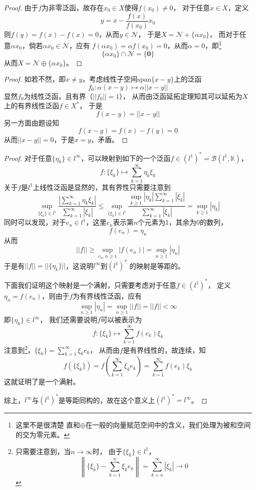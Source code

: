 \documentclass[cn]{homework}
\begin{document}
    \problem
    \begin{proof}
        由于$f$为非零泛函，故存在$x_0\in X$使得$f(x_0)\neq 0$，
        对于任意$x\in X$，定义
        \[y=x-\frac{f(x)}{f(x_0)}x_0\]
        则$f(y)=f(x)-f(x)=0$，从而$y\in\mathscr N$，
        于是$X=\mathscr N+\{\alpha x_0\}$，
        而对于任意$\alpha x_0$，倘若$\alpha x_0\in\mathscr N$，应有
        $f(\alpha x_0)=\alpha f(x_0)=0$，从而$\alpha=0$，即\footnote{这里不是很清楚
        直和$\oplus$在一般的向量赋范空间中的含义，我们处理为被和空间的交为零元素。}
        \[\{\alpha x_0\}\cap\mathscr N=\{\boldsymbol 0\}\]
        从而$X=\mathscr N\oplus\{\alpha x_0\}$。
    \end{proof}

    \problem
    \begin{proof}
        如若不然，即$x\neq y$，考虑线性子空间$\mathrm{span}\{x-y\}$上的泛函
        \[f_0:\alpha(x-y)\mapsto\alpha||x-y||\]
        显然$f_0$为线性泛函，且有界（$||f_0||=1$），
        从而由泛函延拓定理知其可以延拓为$X$上的有界线性泛函$f\in X^*$，
        于是
        \[f(x-y)=||x-y||\]
        另一方面由题设知
        \[f(x-y)=f(x)-f(y)=0\]
        从而$||x-y||=0$，于是$x=y$，矛盾。
    \end{proof}

    \problem
    \begin{proof}
        对于任意$\{\eta_k\}\in l^\infty$，可以映射到如下的一个泛函$f\in
        (l^1)^*=\mathscr B(l^1,\mathbb K)$，
        \[f:\{\xi_k\}\mapsto\sum_{k=1}^\infty\eta_k\xi_k\]
        关于$f$是$l^1$上线性泛函是显然的，其有界性只需要注意到
        \[\sup_{\{\xi_k\}\in l^1}
        \frac{\left|\sum_{k=1}^\infty\eta_k\xi_k\right|}
        {\sum_{k=1}^\infty|\xi_k|}
        \leq\sup_{\{\xi_k\}\in l^1}
        \frac{\sup_{k\geq 1}|\eta_k|\sum_{k=1}^\infty|\xi_k|}{\sum_{k=1}^\infty|\xi_k|}
        =\sup_{k\geq 1}|\eta_k|\]
        同时可以发现，对于$e_n\in l^1$，这里$e_n$表示第$n$个元素为1，其余为0的数列，
        \[f(e_n)=\eta_n\]
        从而
        \[||f||\geq\sup_{e_n,n\geq 1}|f(e_n)|=\sup_{n\geq 1}|\eta_n|\]
        于是有$||f||=||\{\eta_k\}||$，这说明$l^\infty$到$(l^1)^*$
        的映射是等距的。

        下面我们证明这个映射是一个满射，只需要考虑对于任意$f\in(l^1)^*$，
        定义$\eta_n=f(e_n)$，则由于$f$为有界线性泛函，应有
        \[\sup_{n\geq 1}|\eta_n|=\sup_{n\geq 1}||f||=||f||<\infty\]
        即$\{\eta_k\}\in l^\infty$，
        我们还需要说明$f$可以被表示为
        \[f:\{\xi_k\}\mapsto\sum_{k=1}^\infty f(e_k)\xi_k\]
        注意到\footnote{只需要注意到，当$n\to\infty$时，
        由于$\{\xi_k\}\in l^1$，
            \[\left\|\{\xi_k\}-\sum_{k=1}^n\xi_ke_k\right\|
            =\sum_{k=n}^\infty|\xi_k|\to 0\]
        }，$\{\xi_k\}=\sum_{k=1}^\infty \xi_ke_k$，
        从而由$f$是有界线性的，故连续，知
        \[f(\{\xi_k\})=f(\sum_{k=1}^\infty\xi_ke_k)=\sum_{k=1}^\infty f(e_k)\xi_k\]
        这就证明了是一个满射。

        综上，$l^\infty$与$(l^1)^*$是等距同构的，故在这个意义上$(l^1)^*=l^\infty$。
    \end{proof}
\end{document}
